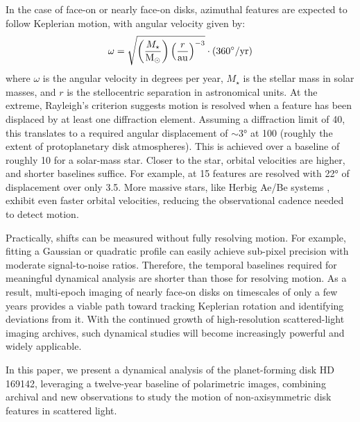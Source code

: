In the case of face-on or nearly face-on disks, azimuthal features are expected to follow Keplerian motion, with angular velocity given by:
\begin{equation}
    \omega = \sqrt{\left(\frac{M_\star}{\mathrm{M_\odot}} \right)\left(\frac{r}{\mathrm{au}} \right)^{-3}}\cdot\left(360\degree\mathrm{/yr}\right)
\end{equation}
where $\omega$ is the angular velocity in degrees per year, $M_\star$ is the stellar mass in solar masses, and $r$ is the stellocentric separation in astronomical units. At the extreme, Rayleigh's criterion suggests motion is resolved when a feature has been displaced by at least one diffraction element. Assuming a diffraction limit of \SI{40}{\mas}, this translates to a required angular displacement of $\sim$\ang{3} at \SI{100}{\au} (roughly the extent of protoplanetary disk atmospheres). This is achieved over a baseline of roughly \SI{10}{\year} for a solar-mass star. Closer to the star, orbital velocities are higher, and shorter baselines suffice. For example, at \SI{15}{\au} features are resolved with \ang{22} of displacement over only \SI{3.5}{\year}. More massive stars, like Herbig Ae/Be systems \citep{brittain_herbig_2023}, exhibit even faster orbital velocities, reducing the observational cadence needed to detect motion. 

Practically, shifts can be measured without fully resolving motion. For example, fitting a Gaussian or quadratic profile can easily achieve sub-pixel precision with moderate signal-to-noise ratios. Therefore, the temporal baselines required for meaningful dynamical analysis are shorter than those for resolving motion. As a result, multi-epoch imaging of nearly face-on disks on timescales of only a few years provides a viable path toward tracking Keplerian rotation and identifying deviations from it. With the continued growth of high-resolution scattered-light imaging archives, such dynamical studies will become increasingly powerful and widely applicable.

In this paper, we present a dynamical analysis of the planet-forming disk HD 169142, leveraging a twelve-year baseline of polarimetric images, combining archival and new observations to study the motion of non-axisymmetric disk features in scattered light.
